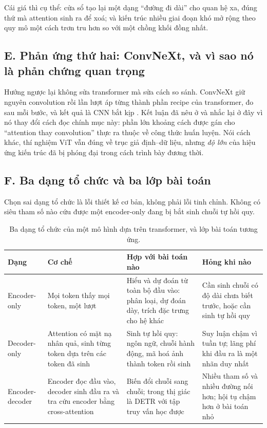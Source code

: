 \documentclass[../../../deep_learning.tex]{subfiles}
\begin{document}
Cái giá thì cụ thể: cửa sổ tạo lại một dạng ``đường đi dài'' cho quan hệ xa, đúng thứ mà attention sinh ra để xoá; và kiến trúc nhiều giai đoạn khó mở rộng theo quy mô một cách trơn tru hơn so với một chồng khối đồng nhất.

\subsection{E. Phản ứng thứ hai: ConvNeXt, và vì sao nó là phản chứng quan trọng}
Hướng ngược lại không sửa transformer mà sửa cách so sánh. ConvNeXt giữ nguyên convolution rồi lần lượt áp từng thành phần recipe của transformer, đo sau mỗi bước, và kết quả là CNN bắt kịp \cite{liu2022convnext}. Kết luận đã nêu ở  và nhắc lại ở đây vì nó thay đổi cách đọc chính mục này: phần lớn khoảng cách được gán cho ``attention thay convolution'' thực ra thuộc về công thức huấn luyện. Nói cách khác, thí nghiệm ViT vẫn đúng về trục giả định--dữ liệu, nhưng \emph{độ lớn} của hiệu ứng kiến trúc đã bị phóng đại trong cách trình bày đương thời.

\subsection{F. Ba dạng tổ chức và ba lớp bài toán}
Chọn sai dạng tổ chức là lỗi thiết kế cơ bản, không phải lỗi tinh chỉnh. Không có siêu tham số nào cứu được một encoder-only đang bị bắt sinh chuỗi tự hồi quy.

\begin{table}[H]\centering\footnotesize
\caption{Ba dạng tổ chức của một mô hình dựa trên transformer, và lớp bài toán tương ứng.}
\label{tab:ba-dang}
\begin{tabularx}{\linewidth}{@{}L{2.35cm}L{3.1cm}YY@{}}
\toprule
\textbf{Dạng} & \textbf{Cơ chế} & \textbf{Hợp với bài toán nào} & \textbf{Hỏng khi nào}\\
\midrule
Encoder-only & Mọi token thấy mọi token, một lượt & Hiểu và dự đoán từ toàn bộ đầu vào: phân loại, dự đoán dày, trích đặc trưng cho hệ khác & Cần sinh chuỗi có độ dài chưa biết trước, hoặc cần sinh tự hồi quy\\
Decoder-only & Attention có mặt nạ nhân quả, sinh từng token dựa trên các token đã sinh & Sinh tự hồi quy: ngôn ngữ, chuỗi hành động, mã hoá ảnh thành token rồi sinh & Suy luận chậm vì tuần tự; lãng phí khi đầu ra là một nhãn duy nhất\\
Encoder-decoder & Encoder đọc đầu vào, decoder sinh đầu ra và tra cứu encoder bằng cross-attention & Biến đổi chuỗi sang chuỗi; trong thị giác là DETR với tập truy vấn học được \cite{carion2020detr} & Nhiều tham số và nhiều đường nối hơn; hội tụ chậm hơn ở bài toán nhỏ\\
\bottomrule
\end{tabularx}
\end{table}
\end{document}
